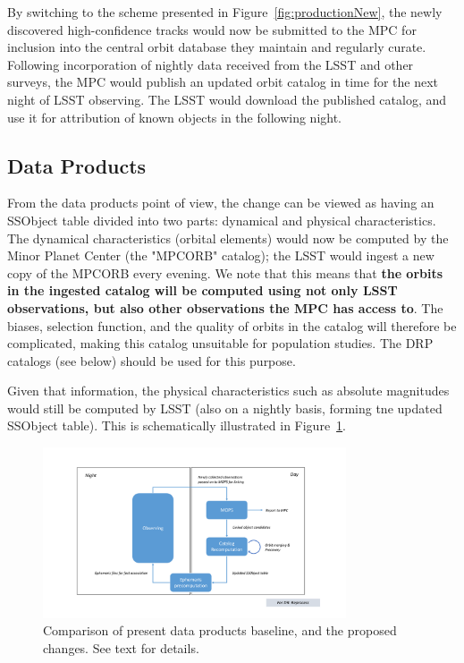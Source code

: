 \documentclass[DM,authoryear,toc,lsstdraft]{lsstdoc}
\begin{document}
By switching to the scheme presented in Figure~\ref{fig:productionNew}, the newly discovered high-confidence tracks would now be submitted to the MPC for inclusion into the central orbit database they maintain and regularly curate. Following incorporation of nightly data received from the LSST and other surveys, the MPC would publish an updated orbit catalog in time for the next night of LSST observing. The LSST would download the published catalog, and use it for attribution of known objects in the following night.

\subsection{Data Products}

From the data products point of view, the change can be viewed as having an SSObject table divided into two parts: dynamical and physical characteristics. The dynamical characteristics (orbital elements) would now be computed by the Minor Planet Center (the "MPCORB" catalog); the LSST would ingest a new copy of the MPCORB every evening. We note that this means that {\bf the orbits in the ingested catalog will be computed using not only LSST observations, but also other observations the MPC has access to}. The biases, selection function, and the quality of orbits in the catalog will therefore be complicated, making this catalog unsuitable for population studies. The DRP catalogs (see below) should be used for this purpose.

Given that information, the physical characteristics such as absolute magnitudes would still be computed by LSST (also on a nightly basis, forming tne updated SSObject table). This is schematically illustrated in Figure~\ref{fig:productsComparison}.

\begin{figure}
	\caption{Comparison of present data products baseline, and the proposed changes. See text for details.\label{fig:productsComparison}}
	\centering
	\includegraphics[page=3,width=0.8\textwidth]{figures/processing.pdf}
\end{figure}
\end{document}
